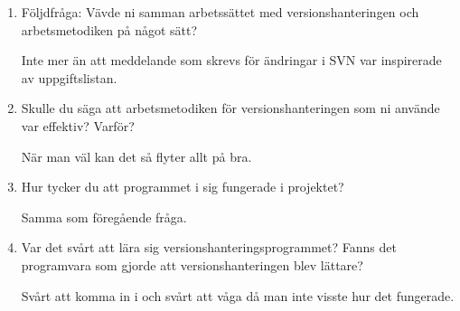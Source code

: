 \begin{enumerate}
  \item Följdfråga: Vävde ni samman arbetssättet med versionshanteringen och arbetsmetodiken på något sätt?

  Inte mer än att meddelande som skrevs för ändringar i SVN var inspirerade av uppgiftslistan.

  \item Skulle du säga att arbetsmetodiken för versionshanteringen som ni använde var effektiv? Varför?

  När man väl kan det så flyter allt på bra.

  \item Hur tycker du att programmet i sig fungerade i projektet?

  Samma som föregående fråga.

  \item Var det svårt att lära sig versionshanteringsprogrammet? Fanns det programvara som gjorde att versionshanteringen blev lättare?

  Svårt att komma in i och svårt att våga då man inte visste hur det fungerade.

\end{enumerate}





